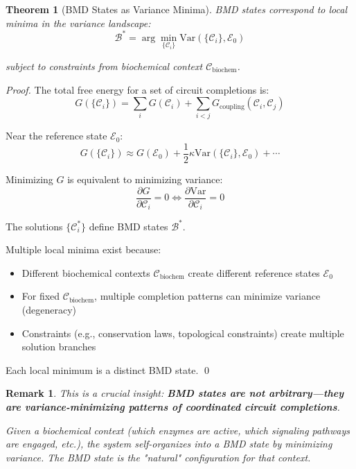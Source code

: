 \documentclass[12pt,a4paper]{article}
\newtheorem{theorem}{Theorem}
\newtheorem{remark}{Remark}
\begin{document}
\begin{theorem}[BMD States as Variance Minima]
\label{thm:bmd_variance_minima}
BMD states correspond to \textit{local minima} in the variance landscape:
\begin{equation}
\mathcal{B}^* = \arg\min_{\{\mathcal{C}_i\}} \text{Var}(\{\mathcal{C}_i\}, \mathcal{E}_0)
\end{equation}

subject to constraints from biochemical context $\mathcal{C}_{\text{biochem}}$.
\end{theorem}

\begin{proof}
The total free energy for a set of circuit completions is:
\begin{equation}
G(\{\mathcal{C}_i\}) = \sum_i G(\mathcal{C}_i) + \sum_{i<j} G_{\text{coupling}}(\mathcal{C}_i, \mathcal{C}_j)
\end{equation}

Near the reference state $\mathcal{E}_0$:
\begin{equation}
G(\{\mathcal{C}_i\}) \approx G(\mathcal{E}_0) + \frac{1}{2} \kappa \text{Var}(\{\mathcal{C}_i\}, \mathcal{E}_0) + \cdots
\end{equation}

Minimizing $G$ is equivalent to minimizing variance:
\begin{equation}
\frac{\partial G}{\partial \mathcal{C}_i} = 0 \iff \frac{\partial \text{Var}}{\partial \mathcal{C}_i} = 0
\end{equation}

The solutions $\{\mathcal{C}_i^*\}$ define BMD states $\mathcal{B}^*$.

Multiple local minima exist because:
\begin{itemize}
\item Different biochemical contexts $\mathcal{C}_{\text{biochem}}$ create different reference states $\mathcal{E}_0$
\item For fixed $\mathcal{C}_{\text{biochem}}$, multiple completion patterns can minimize variance (degeneracy)
\item Constraints (e.g., conservation laws, topological constraints) create multiple solution branches
\end{itemize}

Each local minimum is a distinct BMD state. \qed
\end{proof}

\begin{remark}
This is a crucial insight: \textbf{BMD states are not arbitrary—they are variance-minimizing patterns of coordinated circuit completions}.

Given a biochemical context (which enzymes are active, which signaling pathways are engaged, etc.), the system self-organizes into a BMD state by minimizing variance. The BMD state is the "natural" configuration for that context.
\end{remark}
\end{document}
